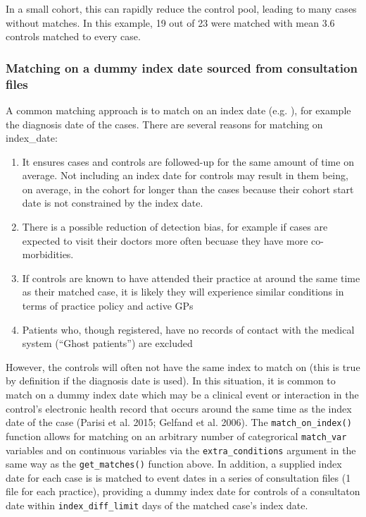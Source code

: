 \documentclass[]{article}
\begin{document}
In a small cohort, this can rapidly reduce the control pool, leading to
many cases without matches. In this example, 19 out of 23 were matched
with mean 3.6 controls matched to every case.

\subsubsection{Matching on a dummy index date sourced from consultation
files}\label{matching-on-a-dummy-index-date-sourced-from-consultation-files}

A common matching approach is to match on an index date (e.g. ), for
example the diagnosis date of the cases. There are several reasons for
matching on index\_date:

\begin{enumerate}
\def\labelenumi{\arabic{enumi}.}
\itemsep1pt\parskip0pt
\item
  It ensures cases and controls are followed-up for the same amount of
  time on average. Not including an index date for controls may result
  in them being, on average, in the cohort for longer than the cases
  because their cohort start date is not constrained by the index date.
\item
  There is a possible reduction of detection bias, for example if cases
  are expected to visit their doctors more often becuase they have more
  co-morbidities.
\item
  If controls are known to have attended their practice at around the
  same time as their matched case, it is likely they will experience
  similar conditions in terms of practice policy and active GPs
\item
  Patients who, though registered, have no records of contact with the
  medical system (``Ghost patients'') are excluded
\end{enumerate}

However, the controls will often not have the same index to match on
(this is true by definition if the diagnosis date is used). In this
situation, it is common to match on a dummy index date which may be a
clinical event or interaction in the control's electronic health record
that occurs around the same time as the index date of the case (Parisi
et al. 2015; Gelfand et al. 2006). The \texttt{match\_on\_index()}
function allows for matching on an arbitrary number of categrorical
\texttt{match\_var} variables and on continuous variables via the
\texttt{extra\_conditions} argument in the same way as the
\texttt{get\_matches()} function above. In addition, a supplied index
date for each case is is matched to event dates in a series of
consultation files (1 file for each practice), providing a dummy index
date for controls of a consultaton date within
\texttt{index\_diff\_limit} days of the matched case's index date.
\end{document}
